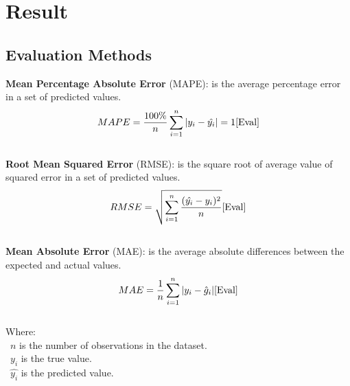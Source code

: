 \documentclass{ieeeojies}
\begin{document}
\section{Result}
\subsection{Evaluation Methods}
\textbf{Mean Percentage Absolute Error} (MAPE): is the average percentage error in a set of predicted values.\\
\[MAPE=\frac{100\%}{n}  \sum_{i=1}^{n} |y_i-\hat{y_i} |  = 1 \cite{Eval}\]\\
\textbf{Root Mean Squared Error} (RMSE): is the square root of average value of squared error in a set of predicted values.\\
\[RMSE=\sqrt{\sum_{i=1}^{n} \frac{(\hat{y_i}-y_i )^2}{n} }\cite{Eval}\]\\
\textbf{Mean Absolute Error} (MAE): is the average absolute differences between the expected and actual values.\\
\[MAE= \frac{1}{n}\sum_{i=1}^{n}|y_i - \hat{g}_i|\cite{Eval} \]\\
Where: \\
	\indent\textbullet\ \(n\) is the number of observations in the dataset.\\
	\indent\textbullet\ \(y_i\)  is the true value.\\
	\indent\textbullet\ \(\hat{y_i}\) is the predicted value.
\end{document}
